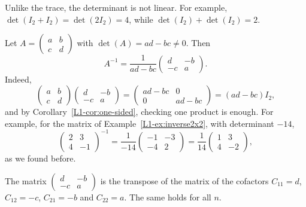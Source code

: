 \begin{remark}
    Unlike the trace, the determinant is not linear. For example, $\det(I_2 + I_2) = \det(2I_2) = 4$, while $\det(I_2) + \det(I_2) = 2$.
\end{remark}

\begin{example}
    Let $A = \begin{pmatrix} a & b \\ c & d \end{pmatrix}$ with $\det(A) = ad - bc \neq 0$. Then
    \[A^{-1} = \frac{1}{ad - bc} \begin{pmatrix}
        d & -b \\
        -c & a
    \end{pmatrix}.\]
    Indeed,
    \[\begin{pmatrix}
        a & b \\
        c & d
    \end{pmatrix} \begin{pmatrix}
        d & -b \\
        -c & a
    \end{pmatrix} = \begin{pmatrix}
        ad - bc & 0 \\
        0 & ad - bc
    \end{pmatrix} = (ad - bc) I_2,\]
    and by Corollary~\ref{L1-cor:one-sided}, checking one product is enough. For example, for the matrix of Example~\ref{L1-ex:inverse2x2}, with determinant $-14$,
    \[\begin{pmatrix}
        2 & 3 \\
        4 & -1
    \end{pmatrix}^{-1} = \frac{1}{-14} \begin{pmatrix}
        -1 & -3 \\
        -4 & 2
    \end{pmatrix} = \frac{1}{14} \begin{pmatrix}
        1 & 3 \\
        4 & -2
    \end{pmatrix},\]
    as we found before.
\end{example}

The matrix $\begin{pmatrix} d & -b \\ -c & a \end{pmatrix}$ is the transpose of the matrix of the cofactors $C_{11} = d$, $C_{12} = -c$, $C_{21} = -b$ and $C_{22} = a$. The same holds for all $n$.


